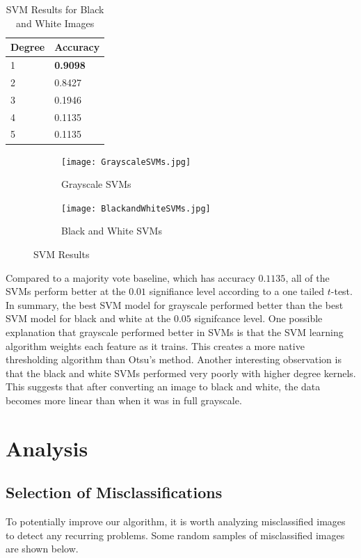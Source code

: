 \documentclass[12pt]{article}
\begin{document}
\begin{table}[ht!]
\centering
\caption{SVM Results for Black and White Images}
    \begin{tabular}{|l|l|}
    \hline
    Degree & Accuracy \\ \hline
    1      & \textbf{0.9098}   \\ \hline
    2      & 0.8427   \\ \hline
    3      & 0.1946   \\ \hline
    4      & 0.1135   \\ \hline
    5      & 0.1135   \\ \hline
    \end{tabular}
\end{table}

\begin{figure}[h]
\centering
\begin{subfigure}{.45\textwidth}
  \centering
  \texttt{[image: GrayscaleSVMs.jpg]}
  \caption{Grayscale SVMs}
  \label{fig:sub1}
\end{subfigure}%
\hspace{2mm}
\begin{subfigure}{.45\textwidth}
  \centering
  \texttt{[image: BlackandWhiteSVMs.jpg]}
  \caption{Black and White SVMs}
  \label{fig:sub2}
\end{subfigure}
\caption{SVM Results}
\label{fig:test}
\end{figure}

Compared to a majority vote baseline, which has accuracy $0.1135$, all of the SVMs perform better at the $0.01$ signifiance level according to a one tailed $t$-test. In summary, the best SVM model for grayscale performed better than the best SVM model for black and white at the $0.05$ signifcance level. One possible explanation that grayscale performed better in SVMs is that the SVM learning algorithm weights each feature as it trains. This creates a more native thresholding algorithm than Otsu's method. Another interesting observation is that the black and white SVMs performed very poorly with higher degree kernels. This suggests that after converting an image to black and white, the data becomes more linear than when it was in full grayscale.

\section*{Analysis}
\subsection*{Selection of Misclassifications}
To potentially improve our algorithm, it is worth analyzing misclassified images to detect any recurring problems. Some random samples of misclassified images are shown below.
\end{document}
